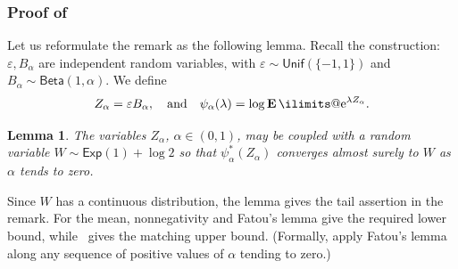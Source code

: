 \documentclass[11pt, letterpaper, hidelinks]{article}
\makeatletter
\newcommand{\e}{\mathrm{e}}
\newcommand{\1}{\mathbf 1}
\newcommand{\eps}{\varepsilon}
\newcommand{\E}{\operatorname*{\mathbf{E}}\ilimits@}
\theoremstyle{plain}
\newtheorem{lemma}{Lemma}[section]
\theoremstyle{definition}
\makeatother
\begin{document}
\subsubsection{Proof of~}
\label{sec:proof-of-remark-1d-cgf}
Let us reformulate the remark as the following lemma. 
Recall the construction: $\eps, B_\alpha$ are independent random variables, with $\eps \sim \mathsf{Unif}(\{-1, 1\})$ and $B_\alpha \sim \mathsf{Beta}(1, \alpha)$. We define 
\[
Z_\alpha = \eps B_\alpha, \quad \mbox{and} \quad 
\psi_\alpha(\lambda) = \log \E \e^{\lambda Z_\alpha}. 
\]
\begin{lemma}
\label{lem:restated-remark-on-sharpness}
The variables $Z_\alpha$, $\alpha\in(0,1)$, may be coupled with a random variable
$W\sim\mathsf{Exp}(1)+\log 2$ so that
$\psi_\alpha^\ast(Z_\alpha)$ converges almost surely to $W$ as $\alpha$ tends to zero.
\end{lemma}
Since $W$ has a continuous distribution, the lemma gives the tail assertion in the remark. For the mean, nonnegativity and Fatou's lemma give the required lower bound, while~ gives the matching upper bound. (Formally, apply Fatou's lemma along any sequence of positive values of $\alpha$ tending to zero.)
\end{document}
